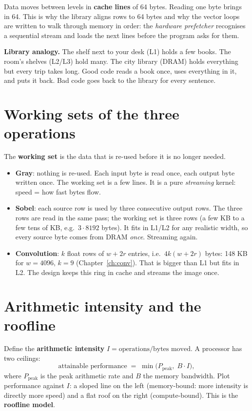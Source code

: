 Data moves between levels in \textbf{cache lines} of 64 bytes. Reading one byte brings in 64. This is why the library aligns rows to 64 bytes and why the vector loops are written to walk through memory in order: the \emph{hardware prefetcher} recognises a sequential stream and loads the next lines before the program asks for them.

\begin{plain}
\textbf{Library analogy.} The shelf next to your desk (L1) holds a few books. The room's shelves (L2/L3) hold many. The city library (DRAM) holds everything but every trip takes long. Good code reads a book once, uses everything in it, and puts it back. Bad code goes back to the library for every sentence.
\end{plain}

\section{Working sets of the three operations}

The \textbf{working set} is the data that is re-used before it is no longer needed.
\begin{itemize}
\item \textbf{Gray}: nothing is re-used. Each input byte is read once, each output byte written once. The working set is a few lines. It is a pure \emph{streaming} kernel: speed = how fast bytes flow.
\item \textbf{Sobel}: each source row is used by three consecutive output rows. The three rows are read in the same pass; the working set is three rows (a few KB to a few tens of KB, e.g.\ $3\cdot8192$ bytes). It fits in L1/L2 for any realistic width, so every source byte comes from DRAM \emph{once}. Streaming again.
\item \textbf{Convolution}: $k$ float rows of $w+2r$ entries, i.e.\ $4k(w+2r)$ bytes: 148 KB for $w=4096$, $k=9$ (Chapter~\ref{ch:conv}). That is bigger than L1 but fits in L2. The design keeps this ring in cache and streams the image once.
\end{itemize}

\section{Arithmetic intensity and the roofline}

Define the \textbf{arithmetic intensity} $I=\text{operations}/\text{bytes moved}$. A processor has two ceilings:
\[
\text{attainable performance}\;=\;\min\bigl(P_{\text{peak}},\;B\cdot I\bigr),
\]
where $P_{\text{peak}}$ is the peak arithmetic rate and $B$ the memory bandwidth. Plot performance against $I$: a sloped line on the left (memory-bound: more intensity is directly more speed) and a flat roof on the right (compute-bound). This is the \textbf{roofline model}.

